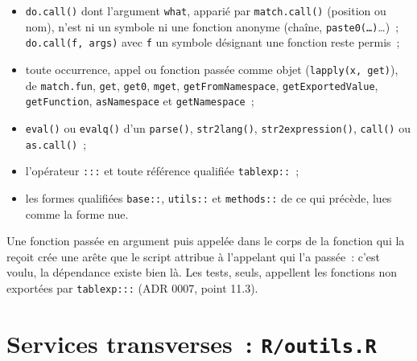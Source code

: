 \documentclass[a4paper,11pt]{article}
\newcommand{\code}[1]{\texttt{\small #1}}
\begin{document}
\begin{itemize}[leftmargin=*, itemsep=2pt]
  \item \code{do.call()} dont l'argument \code{what}, apparié par
    \code{match.call()} (position ou nom), n'est ni un symbole ni une fonction
    anonyme (chaîne, \code{paste0(\ldots)}\ldots)~; \code{do.call(f, args)} avec
    \code{f} un symbole désignant une fonction reste permis~;
  \item toute occurrence, appel ou fonction passée comme objet
    (\code{lapply(x, get)}), de \code{match.fun}, \code{get}, \code{get0},
    \code{mget}, \code{getFromNamespace}, \code{getExportedValue},
    \code{getFunction}, \code{asNamespace} et \code{getNamespace}~;
  \item \code{eval()} ou \code{evalq()} d'un \code{parse()}, \code{str2lang()},
    \code{str2expression()}, \code{call()} ou \code{as.call()}~;
  \item l'opérateur \code{:::} et toute référence qualifiée \code{tablexp::}~;
  \item les formes qualifiées \code{base::}, \code{utils::} et \code{methods::}
    de ce qui précède, lues comme la forme nue.
\end{itemize}

\noindent
Une fonction passée en argument puis appelée dans le corps de la fonction qui la reçoit crée une arête
que le script attribue à l'appelant qui l'a passée~: c'est voulu, la
dépendance existe bien là. Les tests, seuls, appellent les fonctions non
exportées par \code{tablexp:::} (ADR 0007, point 11.3).

\section{Services transverses~: \code{R/outils.R}}
\label{sec:outils}
\end{document}
